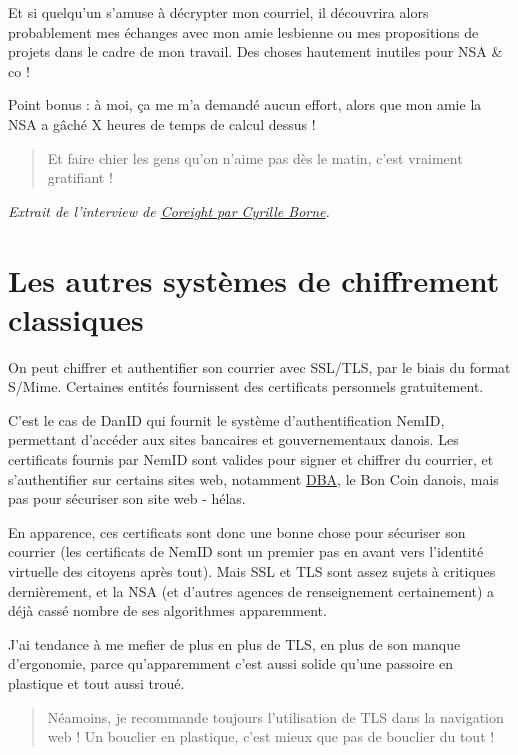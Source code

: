 Et si quelqu'un s'amuse à décrypter mon courriel, il découvrira alors
probablement mes échanges avec mon amie lesbienne ou mes propositions de
projets dans le cadre de mon travail. Des choses hautement inutiles pour
NSA \& co !

Point bonus : à moi, ça me m'a demandé aucun effort, alors que mon amie
la NSA a gâché X heures de temps de calcul dessus !

\begin{quote}
Et faire chier les gens qu'on n'aime pas dès le matin, c'est vraiment gratifiant !
\end{quote}

\emph{Extrait de l'interview de
\href{http://cyrille-borne.com/article47/du-berger-a-la-bergere-l-interview-de-coreight}{Coreight
par Cyrille Borne}.}

\section{Les autres systèmes de chiffrement classiques}\label{les-autres-systuxe8mes-de-chiffrement-classiques}

On peut chiffrer et authentifier son courrier avec SSL/TLS, par le biais
du format S/Mime. Certaines entités fournissent des certificats
personnels gratuitement.

C'est le cas de DanID qui fournit le système d'authentification NemID,
permettant d'accéder aux sites bancaires et gouvernementaux danois. Les
certificats fournis par NemID sont valides pour signer et chiffrer du
courrier, et s'authentifier sur certains sites web, notamment
\href{http://www.dba.dk/}{DBA}, le Bon Coin danois, mais pas pour
sécuriser son site web - hélas.

En apparence, ces certificats sont donc une bonne chose pour sécuriser
son courrier (les certificats de NemID sont un premier pas en avant vers
l'identité virtuelle des citoyens après tout). Mais SSL et TLS sont
assez sujets à critiques dernièrement, et la NSA (et d'autres agences de
renseignement certainement) a déjà cassé nombre de ses algorithmes
apparemment.

J'ai tendance à me mefier de plus en plus de TLS, en plus de son manque
d'ergonomie, parce qu'apparemment c'est aussi solide qu'une passoire en
plastique et tout aussi troué.

\begin{quote}
	Néamoins, je recommande toujours l'utilisation de TLS dans la
navigation web ! Un bouclier en plastique, c'est mieux que pas de
bouclier du tout !
\end{quote}

